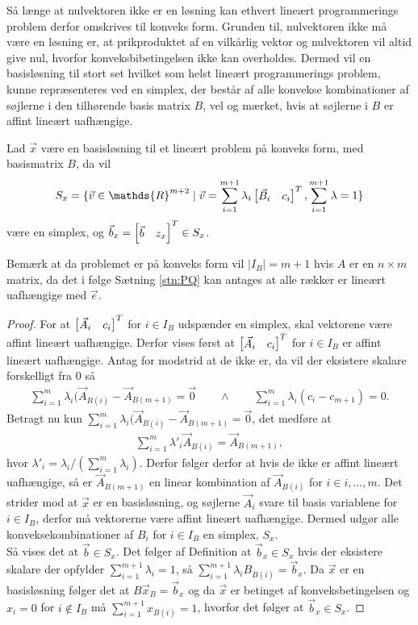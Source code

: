 Så længe at nulvektoren ikke er en løsning kan ethvert lineært programmerings problem derfor omskrives til konveks form.
Grunden til, nulvektoren ikke må være en løsning er, at prikproduktet af en vilkårlig vektor og nulvektoren vil altid give nul, hvorfor konveksbibetingelsen ikke kan overholdes.
Dermed vil en basisløsning til stort set hvilket som helst lineært programmerings problem, kunne repræsenteres ved en simplex, der består af alle konvekse kombinationer af søjlerne i den tilhørende basis matrix $B$, vel og mærket, hvis at søjlerne i $B$ er affint lineært uafhængige.
\begin{stn}
Lad $\vec{x}$ være en basisløsning til et lineært problem på konveks form, med basismatrix $B$, da vil
\begin{align*}
S_x = \{\vec{v} \in \mathds{R}^{m+2} \mid \vec{v} = \sum_{i=1}^{m+1} \lambda_i \rvect{\vec{B}_i & c_i}^T, \sum_{i=1}^{m+1} \lambda = 1\}
\end{align*}
være en simplex, og $\vec{b}_x = \begin{bmatrix} \vec{b}& z_x \end{bmatrix}^T \in S_x$.
\end{stn}
Bemærk at da problemet er på konveks form vil $|I_B| = m+1$ hvis $A$ er en $n\times m$ matrix, da det i følge Sætning \ref{stn:PQ}
kan antages at alle rækker er lineært uafhængige med $\vec{e}$.
\begin{proof}
For at $\begin{bmatrix} \vec{A}_i & c_i \end{bmatrix}^T$ for $i \in I_B$ udspænder en simplex, skal vektorene være affint lineært uafhængige.
Derfor vises først at $\begin{bmatrix} \vec{A}_i & c_i \end{bmatrix}^T$ for $i \in I_B$ er affint lineært uafhængige.
Antag for modstrid at de ikke er, da vil der eksistere skalare forskelligt fra $0$ så
\begin{align*}
\sum_{i = 1}^{m} \lambda_i (\vec{A}_{B(i)} - \vec{A}_{B(m+1)} =  \vec{0} \qquad \wedge \qquad \sum_{i=1}^{m} \lambda_i (c_i - c_{m+1})= 0.
\end{align*}
Betragt nu kun $\sum_{i = 1}^{m} \lambda_i (\vec{A}_{B(i)} - \vec{A}_{B(m+1)} =  \vec{0}$, det medføre at
\begin{align*}
\sum_{i = 1}^{m} \lambda'_i \vec{A}_{B(i)} = \vec{A}_{B(m+1)},
\end{align*}
hvor $\lambda'_i = \lambda_i/(\sum_{i=1}^m \lambda_i)$.
Derfor følger derfor at hvis de ikke er affint lineært uafhængige, så er $\vec{A}_{B(m+1)}$ en linear kombination af $\vec{A}_{B(i)}$ for $i  \in i,..., m$.
Det strider mod at $\vec{x}$ er en basisløsning, og søjlerne $\vec{A}_i$ svare til basis variablene for $i \in I_B$, derfor må vektorerne være affint lineært uafhængige. 
Dermed udgør alle konveksekombinationer af $B_i$ for $i \in I_B$ en simplex, $S_x$.
\\ Så vises det at $\vec{b} \in S_x$. 
Det følger af Definition
at $\vec{b}_x\in S_x$ hvis der eksistere skalare der opfylder $\sum_{i=1}^{m+1} \lambda_i = 1$, så $\sum_{i=1}^{m+1}\lambda_i B_{B(i)}  = \vec{b}_x$.
Da $\vec{x}$ er en basisløsning følger det at $B \vec{x}_B = \vec{b}_x$ og da $\vec{x}$ er betinget af konveksbetingelsen og $x_i = 0 $ for $i \notin I_B$ må $\sum_{i=1}^{m+1} x_{B(i)} = 1$, hvorfor det følger at $\vec{b}_x \in S_x$.
\end{proof}
